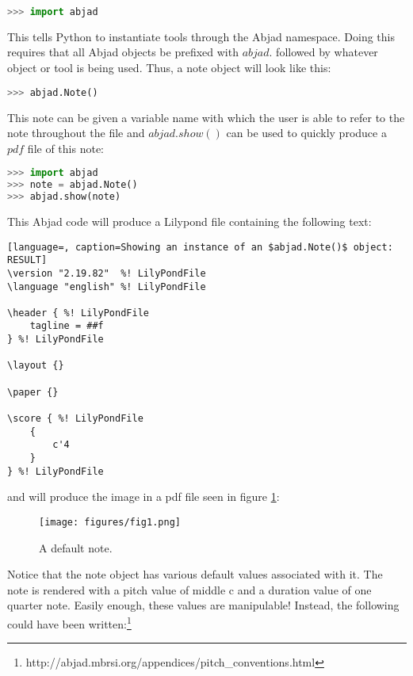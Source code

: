 \singlespace
\begin{lstlisting}[language=Python, caption=Import statement format]
>>> import abjad
\end{lstlisting}
\doublespace

This tells Python to instantiate tools through the Abjad namespace. Doing this requires that all Abjad objects be prefixed with $abjad.$ followed by whatever object or tool is being used. Thus, a note object will look like this:

\singlespace
\begin{lstlisting}[language=Python, caption=Format for object instantiation]
>>> abjad.Note()
\end{lstlisting}
\doublespace

This note can be given a variable name with which the user is able to refer to the note throughout the file and $abjad.show()$ can be used to quickly produce a $pdf$ file of this note:

\singlespace
\begin{lstlisting}[language=Python, caption=Showing an $abjad.Note()$ object]
>>> import abjad
>>> note = abjad.Note()
>>> abjad.show(note)
\end{lstlisting}
\doublespace

This Abjad code will produce a Lilypond file containing the following text:

\singlespace
\begin{lstlisting}[language=, caption=Showing an instance of an $abjad.Note()$ object: RESULT]
\version "2.19.82"  %! LilyPondFile
\language "english" %! LilyPondFile

\header { %! LilyPondFile
    tagline = ##f
} %! LilyPondFile

\layout {}

\paper {}

\score { %! LilyPondFile
    {
        c'4
    }
} %! LilyPondFile
\end{lstlisting}
\doublespace

and will produce the image in a pdf file seen in figure \ref{fig:default_note}:

\singlespace
\begin{figure}[h]
  \texttt{[image: figures/fig1.png]}
  \caption{A default note.}
  \label{fig:default_note}
\end{figure}
\doublespace

Notice that the note object has various default values associated with it. The note is rendered with a pitch value of middle c and a duration value of one quarter note. Easily enough, these values are manipulable! Instead, the following could have been written:\footnote{http://abjad.mbrsi.org/appendices/pitch\_conventions.html}

